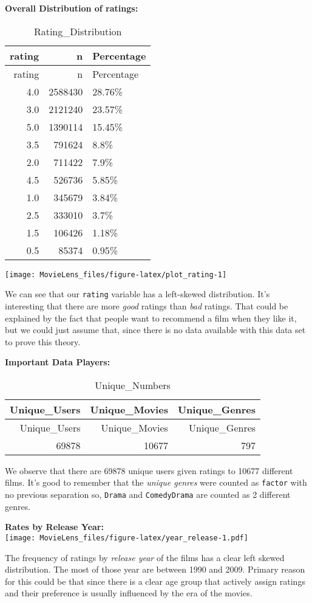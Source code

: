 \documentclass[
]{article}
\begin{document}
\newpage

\textbf{Overall Distribution of ratings:}

\begin{longtable}[]{@{}rrl@{}}
\caption{Rating\_Distribution}\tabularnewline
\toprule
rating & n & Percentage\tabularnewline
\midrule
\endfirsthead
\toprule
rating & n & Percentage\tabularnewline
\midrule
\endhead
4.0 & 2588430 & 28.76\%\tabularnewline
3.0 & 2121240 & 23.57\%\tabularnewline
5.0 & 1390114 & 15.45\%\tabularnewline
3.5 & 791624 & 8.8\%\tabularnewline
2.0 & 711422 & 7.9\%\tabularnewline
4.5 & 526736 & 5.85\%\tabularnewline
1.0 & 345679 & 3.84\%\tabularnewline
2.5 & 333010 & 3.7\%\tabularnewline
1.5 & 106426 & 1.18\%\tabularnewline
0.5 & 85374 & 0.95\%\tabularnewline
\bottomrule
\end{longtable}

\begin{center}\texttt{[image: MovieLens\_files/figure-latex/plot\_rating-1]} \end{center}

We can see that our \texttt{rating} variable has a left-skewed
distribution. It's interesting that there are more \emph{good} ratings
than \emph{bad} ratings. That could be explained by the fact that people
want to recommend a film when they like it, but we could just assume
that, since there is no data available with this data set to prove this
theory.\\
\newpage

\textbf{Important Data Players:}

\begin{longtable}[]{@{}rrr@{}}
\caption{Unique\_Numbers}\tabularnewline
\toprule
Unique\_Users & Unique\_Movies & Unique\_Genres\tabularnewline
\midrule
\endfirsthead
\toprule
Unique\_Users & Unique\_Movies & Unique\_Genres\tabularnewline
\midrule
\endhead
69878 & 10677 & 797\tabularnewline
\bottomrule
\end{longtable}

We observe that there are 69878 unique users given ratings to 10677
different films. It's good to remember that the \emph{unique genres}
were counted as \texttt{factor} with no previous separation so,
\texttt{Drama} and \texttt{Comedy\textbar{}Drama} are counted as 2
different genres.

\textbf{Rates by Release Year:}\\
\texttt{[image: MovieLens\_files/figure-latex/year\_release-1.pdf]}

The frequency of ratings by \emph{release year} of the films has a clear
left skewed distribution. The most of those year are between 1990 and
2009. Primary reason for this could be that since there is a clear age
group that actively assign ratings and their preference is usually
influenced by the era of the movies.
\end{document}
